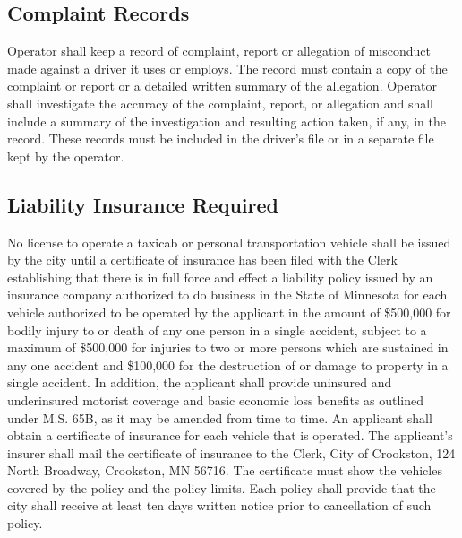 \subsection{Complaint Records}
Operator shall keep a record of complaint, report or allegation of misconduct made against a driver it uses or employs. The record must contain a copy of the complaint or report or a detailed written summary of the allegation.  Operator shall investigate the accuracy of the complaint, report, or allegation and shall include a summary of the investigation and resulting action taken, if any, in the record. These records must be included in the driver’s file or in a separate file kept by the operator.
\subsection{Liability Insurance Required}
No license to operate a taxicab or personal transportation vehicle shall be issued by the city until a certificate of insurance has been filed with the Clerk establishing that there is in full force and effect a liability policy issued by an insurance company authorized to do business in the State of Minnesota for each vehicle authorized to be operated by the applicant in the amount of \$500,000 for bodily injury to or death of any one person in a single accident, subject to a maximum of \$500,000 for injuries to two or more persons which are sustained in any one accident and \$100,000 for the destruction of or damage to property in a single accident.  In addition, the applicant shall provide uninsured and underinsured motorist coverage and basic economic loss benefits as outlined under M.S. \textsection 65B, as it may be amended from time to time.  An applicant shall obtain a certificate of insurance for each vehicle that is operated.  The applicant’s insurer shall mail the certificate of insurance to the Clerk, City of Crookston, 124 North Broadway, Crookston, MN 56716.  The certificate must show the vehicles covered by the policy and the policy limits.  Each policy shall provide that the city shall receive at least ten days written notice prior to cancellation of such policy.
